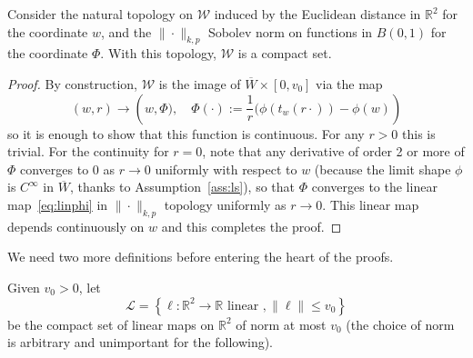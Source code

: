 \documentclass[AHL,Unicode,longabstracts,published]{cedram}
\newcommand{\R}{\mathbb{R}}
\newcommand{\clL}{\mathcal{L}}
\newcommand{\clW}{\mathcal{W}}
\newcommand{\norm}[1]{\lVert #1 \rVert}
\begin{document}
\begin{lemm}\label{lem:compact}
Consider the natural topology on $\clW$ induced by the Euclidean distance in $\R^2$ for the coordinate $w$, and the $\|\cdot\|_{k,p}$ Sobolev norm on functions in $B(0,1)$ for the coordinate $\Phi$. With this topology, $\clW$ is a compact set.
\end{lemm}


\begin{proof}
By construction, $\clW$ is the image of $\overline{W}\times [0,v_0]$ via the map
\begin{equation}
(w,r) \to \left(w,\Phi),\quad \Phi(\cdot):=\frac{1}{r}(\phi(t_w(r\cdot)) - \phi(w)\right)
\end{equation}
so it is enough to show that this function is continuous. For any $r > 0$ this is trivial. For the continuity for $r=0$, note that any derivative of order 2 or more of $ \Phi$ converges to $0$ as $r \to 0$ uniformly with respect to $w$ (because the limit shape $\phi$ is $C^\infty$ in $\overline W$, thanks to Assumption~\ref{ass:ls}), so that $\Phi$ converges to the linear map~\eqref{eq:linphi} in $\|\cdot\|_{k,p}$ topology uniformly as $r \to 0$. This linear map depends continuously on $w$ and this completes the proof.
\end{proof}

We need two more definitions before entering the heart of the proofs.

\begin{defi}
Given $v_0>0$, let
\begin{equation}
\clL = \left\{ \ell : \R^2 \to \R \text{ linear }, \norm{\ell} \leq v_0\right\}
\end{equation}
be the compact set of linear maps on $\R^2$ of norm at most $v_0$ (the choice of norm is arbitrary and unimportant for the following).
\end{defi}
\end{document}
